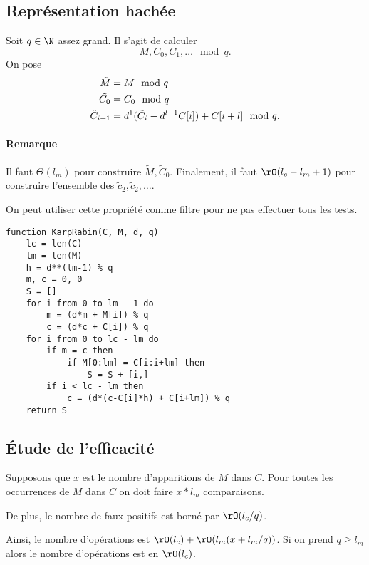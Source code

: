 \documentclass{mybourbaki}
\begin{document}
\subsection{Représentation \og hachée \fg{}}

Soit $q\in \N$ assez grand. Il s'agit de calculer $$M,C_0,C_1,\ldots \mod q.$$
On pose 
\begin{align*}
\tilde{M} &= M \mod q \\
\tilde{C_0} &= C_0 \mod q\\
\tilde{C}_{i+1} &= d\footnotemark(\tilde{C_i}-d^{l-1}C[i])+C[i+l] \mod q.
\end{align*}
\paragraph{Remarque}Il faut $\Theta(l_m)$ pour construire $\tilde{M},\tilde{C}_0$. Finalement, il faut $\rO(l_c-l_m +1)$ pour construire l'ensemble des $\tilde{c}_2,\tilde{c}_2,\ldots$.


On peut utiliser cette propriété comme filtre pour ne pas effectuer tous les tests.

\begin{lstlisting}
function KarpRabin(C, M, d, q)
	lc = len(C)
	lm = len(M)
	h = d**(lm-1) % q
	m, c = 0, 0
	S = []
	for i from 0 to lm - 1 do
		m = (d*m + M[i]) % q
		c = (d*c + C[i]) % q
	for i from 0 to lc - lm do
		if m = c then
			if M[0:lm] = C[i:i+lm] then
				S = S + [i,]
		if i < lc - lm then
			c = (d*(c-C[i]*h) + C[i+lm]) % q
	return S					
\end{lstlisting}

\subsection{\'Etude de l'efficacité}
Supposons que $x$ est le nombre d'apparitions de $M$ dans $C$. Pour toutes les occurrences de $M$ dans $C$ on doit faire $x*l_m$ comparaisons.

De plus, le nombre de faux-positifs est borné par $\rO(l_c/q)$.

Ainsi, le nombre d'opérations est $\rO(l_c) + \rO(l_m(x+l_m/q))$. Si on prend $q\geq l_m$ alors le nombre d'opérations est en $\rO(l_c)$.
\end{document}
